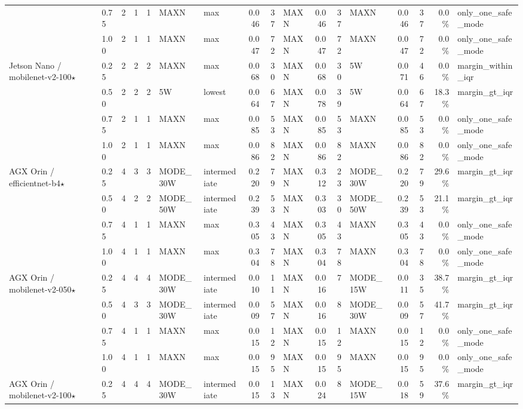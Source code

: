 \documentclass[10pt]{article}
\begin{document}
\begin{center}
\begin{longtable}{@{}l l r r r l l r r l r r l r r r l@{}}
 & 0.75 & 2 & 1 & 1 & MAXN & max & 0.046 & 37 & MAXN & 0.046 & 37 & MAXN & 0.046 & 37 & 0.0\% & only\_one\_safe\_mode \\
 & 1.00 & 2 & 1 & 1 & MAXN & max & 0.047 & 72 & MAXN & 0.047 & 72 & MAXN & 0.047 & 72 & 0.0\% & only\_one\_safe\_mode \\
\addlinespace[2pt]
Jetson Nano / mobilenet-v2-100$\star$ & 0.25 & 2 & 2 & 2 & MAXN & max & 0.068 & 30 & MAXN & 0.068 & 30 & 5W & 0.071 & 46 & 0.0\% & margin\_within\_iqr \\
 & 0.50 & 2 & 2 & 2 & 5W & lowest & 0.064 & 67 & MAXN & 0.078 & 39 & 5W & 0.064 & 67 & 18.3\% & margin\_gt\_iqr \\
 & 0.75 & 2 & 1 & 1 & MAXN & max & 0.085 & 53 & MAXN & 0.085 & 53 & MAXN & 0.085 & 53 & 0.0\% & only\_one\_safe\_mode \\
 & 1.00 & 2 & 1 & 1 & MAXN & max & 0.086 & 82 & MAXN & 0.086 & 82 & MAXN & 0.086 & 82 & 0.0\% & only\_one\_safe\_mode \\
\addlinespace[2pt]
AGX Orin / efficientnet-b4$\star$ & 0.25 & 4 & 3 & 3 & MODE\_30W & intermediate & 0.220 & 79 & MAXN & 0.312 & 23 & MODE\_30W & 0.220 & 79 & 29.6\% & margin\_gt\_iqr \\
 & 0.50 & 4 & 2 & 2 & MODE\_50W & intermediate & 0.239 & 53 & MAXN & 0.303 & 30 & MODE\_50W & 0.239 & 53 & 21.1\% & margin\_gt\_iqr \\
 & 0.75 & 4 & 1 & 1 & MAXN & max & 0.305 & 43 & MAXN & 0.305 & 43 & MAXN & 0.305 & 43 & 0.0\% & only\_one\_safe\_mode \\
 & 1.00 & 4 & 1 & 1 & MAXN & max & 0.304 & 78 & MAXN & 0.304 & 78 & MAXN & 0.304 & 78 & 0.0\% & only\_one\_safe\_mode \\
\addlinespace[2pt]
AGX Orin / mobilenet-v2-050$\star$ & 0.25 & 4 & 4 & 4 & MODE\_30W & intermediate & 0.010 & 11 & MAXN & 0.016 & 7 & MODE\_15W & 0.011 & 35 & 38.7\% & margin\_gt\_iqr \\
 & 0.50 & 4 & 3 & 3 & MODE\_30W & intermediate & 0.009 & 57 & MAXN & 0.016 & 8 & MODE\_30W & 0.009 & 57 & 41.7\% & margin\_gt\_iqr \\
 & 0.75 & 4 & 1 & 1 & MAXN & max & 0.015 & 12 & MAXN & 0.015 & 12 & MAXN & 0.015 & 12 & 0.0\% & only\_one\_safe\_mode \\
 & 1.00 & 4 & 1 & 1 & MAXN & max & 0.015 & 95 & MAXN & 0.015 & 95 & MAXN & 0.015 & 95 & 0.0\% & only\_one\_safe\_mode \\
\addlinespace[2pt]
AGX Orin / mobilenet-v2-100$\star$ & 0.25 & 4 & 4 & 4 & MODE\_30W & intermediate & 0.015 & 13 & MAXN & 0.024 & 8 & MODE\_15W & 0.018 & 59 & 37.6\% & margin\_gt\_iqr \\

\end{longtable}
\end{center}
\end{document}
